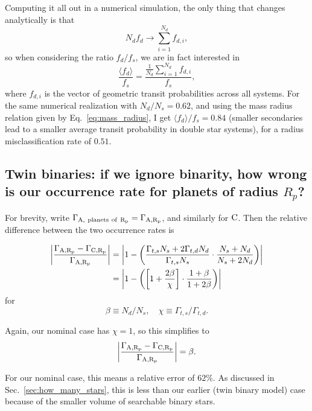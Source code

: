 \documentclass{emulateapj}
\begin{document}
Computing it all out in a numerical simulation, the only thing that changes 
analytically is that
\begin{equation}
N_d f_d \rightarrow \sum_{i=1}^{N_d} f_{d,i},
\end{equation}
so when considering the ratio $f_d/f_s$, we are in fact interested in
\begin{equation}
\frac{\langle f_d \rangle}{f_s} = \frac{\frac{1}{N_d} \sum_{i=1}^{N_d} 
f_{d,i}}{f_s},
\end{equation}
where $f_{d,i}$ is the vector of geometric transit probabilities across all 
systems.
For the same numerical realization with $N_d/N_s = 0.62$, and using the mass 
radius relation given by Eq.~\ref{eq:mass_radius}, I get $\langle f_d 
\rangle / f_s = 0.84$ (smaller secondaries lead to a smaller average transit 
probability in double star systems), for a radius misclassification rate of 
$0.51$.



\subsection{Twin binaries: if we ignore binarity, how wrong is our occurrence 
	rate for planets of radius $R_p$?}

For brevity, write $\Gamma_{\rm A,\ planets\ of\ R_p} = \Gamma_{\rm A,R_p}$, 
and similarly for ${\rm C}$.
Then the relative difference between the two occurrence rates is

\begin{align}
\left|\frac{\Gamma_{\rm A,R_p} - \Gamma_{\rm C,R_p}}
{\Gamma_{\rm A,R_p}} \right| 
&=
\left| 1 - \left(
\frac{\Gamma_{t,s}N_s + 2\Gamma_{t,d}N_d}{\Gamma_{t,s} N_s }  
\cdot 
\frac{N_s + N_d}{N_s + 2N_d }
\right) \right|  \\
&=
\left| 1 - \left(
\left[ 1 + \frac{2\beta}{\chi} \right]
\cdot 
\frac{1 + \beta}{1 + 2\beta }
\right) \right|
\end{align}
for
\begin{equation}
\beta \equiv N_d/N_s, \quad \chi \equiv \Gamma_{t,s}/\Gamma_{t,d}.
\end{equation}

Again, our nominal case has $\chi = 1$, so this simplifies to
\begin{equation}
\left|\frac{\Gamma_{\rm A,R_p} - \Gamma_{\rm C,R_p}}
{\Gamma_{\rm A,R_p}} \right| = \beta.
\end{equation}

For our nominal case, this means a relative error of $62\%$.
As discussed in Sec.~\ref{sec:how_many_stars}, this is less than our earlier 
(twin binary model) case because of the smaller volume of searchable binary 
stars.


\newpage





\end{document}
